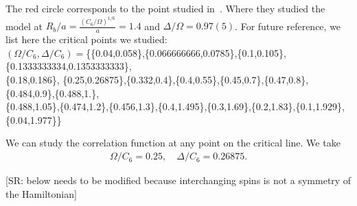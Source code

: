 \documentclass[prb,twocolumn,11pt]{revtex4-1}
\newcommand{\SR}[1]{{\color{red} [SR: #1]}}
\begin{document}
The red circle corresponds to the point studied in~\cite{FangFang:2024eaw}. Where they studied the model at  
$R_b/a=\frac{(C_6/\Omega)^{1/6}}{a}=1.4$ and $\Delta/\Omega=0.97(5)$. 
For future reference, we list here the critical points we studied:
{\\
$(\Omega/C_6,\Delta/C_6)=$\{\{0.04,0.058\},\{0.066666666,0.0785\},\{0.1,0.105\},\{0.1333333334,0.1353333333\},\\
\{0.18,0.186\}, \{0.25,0.26875\},\{0.332,0.4\},\{0.4,0.55\},\{0.45,0.7\},\{0.47,0.8\},\{0.484,0.9\},\{0.488,1.\},\\
\{0.488,1.05\},\{0.474,1.2\},\{0.456,1.3\},\{0.4,1.495\},\{0.3,1.69\},\{0.2,1.83\},\{0.1,1.929\},\{0.04,1.977\}\}\\
}


We can study the correlation function at any point on the critical line. We take
\begin{align}
    \Omega/C_6=0.25,\quad \Delta/C_6=0.26875.
\end{align}

\SR{below needs to be modified because interchanging spins is not a symmetry of the Hamiltonian}
\end{document}
